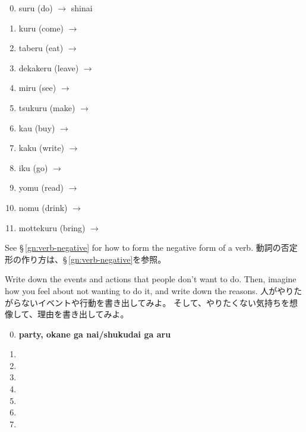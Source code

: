 \documentclass[uplatex,dvipdfmx,b5paper,english,10pt]{jsbook}
\begin{document}
\begin{multicols}{2}
 \begin{enumerate}
 \setcounter{enumi}{-1}
 \item suru (do) $\rightarrow$ shinai%
 \item kuru (come)   $\rightarrow$ \hrulefill
 \item taberu (eat)   $\rightarrow$ \hrulefill
 \item dekakeru (leave) $\rightarrow$ \hrulefill
 \item miru (see)  $\rightarrow$ \hrulefill
 \item tsukuru (make) $\rightarrow$ \hrulefill
 \item kau (buy)   $\rightarrow$ \hrulefill
 \item kaku (write)  $\rightarrow$ \hrulefill
 \item iku (go)   $\rightarrow$ \hrulefill
 \item yomu (read)   $\rightarrow$ \hrulefill
 \item nomu (drink)   $\rightarrow$ \hrulefill
 \item mottekuru (bring)   $\rightarrow$ \hrulefill
 \end{enumerate}
\end{multicols}

\begin{toianswer}
\ifEnglish
See \S\,\ref{gn:verb-negative} for how to form the negative form of a verb.
\else
動詞の否定形の作り方は、\S\,\ref{gn:verb-negative}を参照。
\fi
\end{toianswer}

\begin{toiquestion}
\ifEnglish
Write down the events and actions that people don't want to do.
Then, imagine how you feel about not wanting to do it, and write down the reasons.
\else
人がやりたがらないイベントや行動を書き出してみよ。
そして、やりたくない気持ちを想像して、理由を書き出してみよ。
\fi
\end{toiquestion}

\begin{enumerate}
 \setcounter{enumi}{-1}
 \item {\bfseries party, okane ga nai/shukudai ga aru }\hrulefill
 \item \hrulefill
 \item \hrulefill
 \item \hrulefill
 \item \hrulefill
 \item \hrulefill
 \item \hrulefill
 \item \hrulefill
\end{enumerate}
\end{document}
